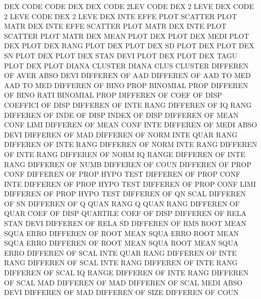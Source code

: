 DEX      CODE                           CODE     DEX
DEX      CODE 2LEV                      CODE     DEX  2    LEVE
DEX      CODE 2    LEVE                 CODE     DEX  2    LEVE
DEX      INTE EFFE PLOT                 SCATTER  PLOT MATR
DEX      INTE EFFE                      SCATTER  PLOT MATR
DEX      INTE PLOT                      SCATTER  PLOT MATR
DEX      MEAN PLOT                      DEX      PLOT
DEX      MEDI PLOT                      DEX      PLOT
DEX      RANG PLOT                      DEX      PLOT
DEX      SD   PLOT                      DEX      PLOT
DEX      SN   PLOT                      DEX      PLOT
DEX      STAN DEVI PLOT                 DEX      PLOT
DEX      TAGU PLOT                      DEX      PLOT
DIANA                                   CLUSTER
DIANA    CLUS                           CLUSTER
DIFFEREN OF   AVER ABSO DEVI            DIFFEREN OF   AAD
DIFFEREN OF   AAD  TO   MED             AAD      TO   MED
DIFFEREN OF   BINO PROP                 BINOMIAL PROP
DIFFEREN OF   BINO RATI                 BINOMIAL PROP
DIFFEREN OF   COEF OF   DISP            COEFFICI OF   DISP
DIFFEREN OF   INTE RANG                 DIFFEREN OF   IQ   RANG
DIFFEREN OF   INDE OF   DISP            INDEX    OF   DISP
DIFFEREN OF   MEAN CONF LIMI            DIFFEREN OF   MEAN CONF INTE
DIFFEREN OF   MEDI ABSO DEVI            DIFFEREN OF   MAD
DIFFEREN OF   NORM INTE QUAR RANG       DIFFEREN OF   INTE RANG
DIFFEREN OF   NORM INTE RANG            DIFFEREN OF   INTE RANG
DIFFEREN OF   NORM IQ   RANGE           DIFFEREN OF   INTE RANG
DIFFEREN OF   NUMB                      DIFFEREN OF   COUN
DIFFEREN OF   PROP CONF                 DIFFEREN OF   PROP HYPO TEST
DIFFEREN OF   PROP CONF INTE            DIFFEREN OF   PROP HYPO TEST
DIFFEREN OF   PROP CONF LIMI            DIFFEREN OF   PROP HYPO TEST
DIFFEREN OF   QN   SCAL                 DIFFEREN OF   SN
DIFFEREN OF   Q    QUAN RANG            Q        QUAN RANG
DIFFEREN OF   QUAR COEF OF   DISP       QUARTILE COEF OF   DISP
DIFFEREN OF   RELA STAN DEVI            DIFFEREN OF   RELA SD
DIFFEREN OF   RMS                       ROOT     MEAN SQUA ERRO
DIFFEREN OF   ROOT MEAN SQUA ERRO       ROOT     MEAN SQUA ERRO
DIFFEREN OF   ROOT MEAN SQUA            ROOT     MEAN SQUA ERRO
DIFFEREN OF   SCAL INTE QUAR RANG       DIFFEREN OF   INTE RANG
DIFFEREN OF   SCAL INTE RANG            DIFFEREN OF   INTE RANG
DIFFEREN OF   SCAL IQ   RANGE           DIFFEREN OF   INTE RANG
DIFFEREN OF   SCAL MAD                  DIFFEREN OF   MAD
DIFFEREN OF   SCAL MEDI ABSO DEVI       DIFFEREN OF   MAD
DIFFEREN OF   SIZE                      DIFFEREN OF   COUN
